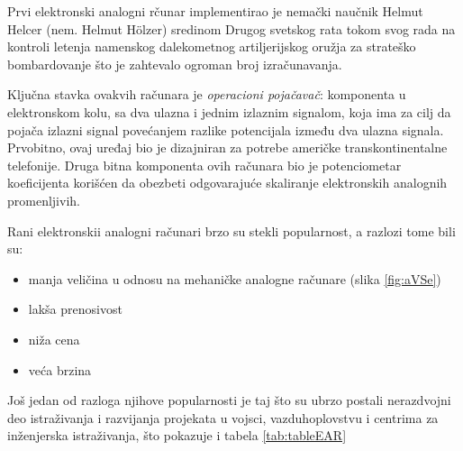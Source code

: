 \documentclass[a4paper]{article}
\begin{document}
		\bigskip
		
		\par Prvi elektronski analogni rčunar implementirao je nemački naučnik Helmut Helcer (nem. Helmut Hölzer) sredinom Drugog svetskog rata tokom svog rada na kontroli letenja namenskog dalekometnog artiljerijskog oružja za strateško bombardovanje što je zahtevalo ogroman broj izračunavanja. \cite{Holzer}
		
		\bigskip
		
		\par Ključna stavka ovakvih računara je \emph{operacioni pojačavač}: komponenta u elektronskom kolu, sa dva ulazna i jednim izlaznim signalom, koja ima za cilj da pojača izlazni signal povećanjem razlike potencijala između dva ulazna signala. Prvobitno, ovaj uređaj bio je dizajniran za potrebe američke transkontinentalne telefonije. Druga bitna komponenta ovih računara bio je potenciometar koeficijenta korišćen da obezbeti odgovarajuće skaliranje elektronskih analognih promenljivih.
		
		\bigskip
		
		\par Rani elektronskii analogni računari brzo su stekli popularnost, a razlozi tome bili su:
		\begin{itemize}
			\item manja veličina u odnosu na mehaničke analogne računare (slika \ref{fig:aVSe})
			\item lakša prenosivost
			\item niža cena
			\item  veća brzina
		\end{itemize}
		Još jedan od razloga njihove popularnosti je taj što su ubrzo postali nerazdvojni deo istraživanja i razvijanja projekata u vojsci, vazduhoplovstvu i centrima za inženjerska istraživanja, što pokazuje i tabela \ref{tab:tableEAR} \cite{table}
		
		\bigskip
		
\end{document}
